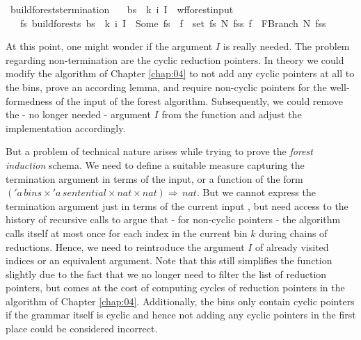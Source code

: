 \begin{isabellebody}
\isanewline
{}\isamarkupfalse%
\ build{\isacharunderscore}{\kern0pt}forests{\isacharprime}{\kern0pt}{\isacharunderscore}{\kern0pt}termination{\isacharcolon}{\kern0pt}\isanewline
\ \ \ {\isachardoublequoteopen}{\isacharparenleft}{\kern0pt}bs{\isacharcomma}{\kern0pt}\ {\isasymomega}{\isacharcomma}{\kern0pt}\ k{\isacharcomma}{\kern0pt}\ i{\isacharcomma}{\kern0pt}\ I{\isacharparenright}{\kern0pt}\ {\isasymin}\ wf{\isacharunderscore}{\kern0pt}forest{\isacharunderscore}{\kern0pt}input{\isachardoublequoteclose}\isanewline
\ \ \ {\isachardoublequoteopen}{\isasymexists}fs{\isachardot}{\kern0pt}\ build{\isacharunderscore}{\kern0pt}forests{\isacharprime}{\kern0pt}\ bs\ {\isasymomega}\ k\ i\ I\ {\isacharequal}{\kern0pt}\ Some\ fs\ {\isasymand}\ {\isacharparenleft}{\kern0pt}{\isasymforall}f\ {\isasymin}\ set\ fs{\isachardot}{\kern0pt}\ {\isasymexists}N\ fss{\isachardot}{\kern0pt}\ f\ {\isacharequal}{\kern0pt}\ FBranch\ N\ fss{\isacharparenright}{\kern0pt}{\isachardoublequoteclose}%
\isadelimproof
%
\endisadelimproof
%
\isatagproof
%
\endisatagproof
{\isafoldproof}%
%
\isadelimproof
%
\endisadelimproof
%
\begin{isamarkuptext}%
At this point, one might wonder if the argument $I$ is really needed. The problem regarding non-termination
are the cyclic reduction pointers. In theory we could modify the algorithm of Chapter \ref{chap:04} to not
add any cyclic pointers at all to the bins, prove an according lemma, and require non-cyclic pointers
for the well-formedness of the input of the forest algorithm. Subsequently, we could remove the - no longer
needed - argument $I$ from the function  and adjust the implementation accordingly.

But a problem of technical nature arises while trying to prove the \textit{forest induction} schema.
We need to define a suitable measure capturing the termination argument in terms of the input, or a function
of the form $('a \, \mathit{bins} \times 'a \, \mathit{sentential} \times \mathit{nat} \times \mathit{nat}) \Rightarrow \, \mathit{nat}$.
But we cannot express the termination argument just in terms of the current input , but need access to
the history of recursive calls to argue that - for non-cyclic pointers - the algorithm calls itself
at most once for each index in the current bin $k$ during chains of reductions. Hence, we need to reintroduce
the argument $I$ of already visited indices or an equivalent argument. Note that this still simplifies
the function  slightly due to the fact that we no longer need to filter the list
of reduction pointers, but comes at the cost of computing cycles of reduction pointers in the algorithm
of Chapter \ref{chap:04}. Additionally, the bins only contain cyclic pointers if the grammar itself is
cyclic and hence not adding any cyclic pointers in the first place could be considered incorrect.


\end{isamarkuptext}
\end{isabellebody}
